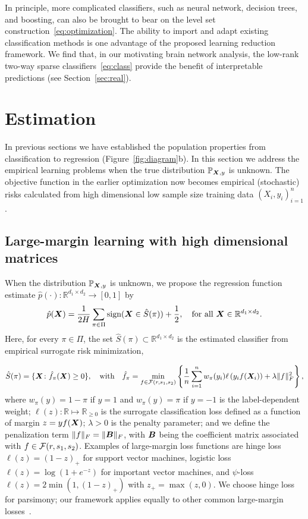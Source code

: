 \documentclass[11pt]{article}
\theoremstyle{plain}
\theoremstyle{definition}
\def\sign{\textup{sign}}
\begin{document}
In principle, more complicated classifiers, such as neural network, decision trees, and boosting, can also be brought to bear on the level set construction~\eqref{eq:optimization}. The ability to import and adapt existing classification methods is one advantage of the proposed learning reduction framework. We find that, in our motivating brain network analysis, the low-rank two-way sparse classifiers~\eqref{eq:class} provide the benefit of interpretable predictions (see Section~\ref{sec:real}). 

\section{Estimation}\label{sec:theory}
In previous sections we have established the population properties from classification to regression (Figure~\ref{fig:diagram}b). In this section we address the empirical learning problems when the true distribution $\mathbb{P}_{\bm X,y}$ is unknown. The objective function in the earlier optimization now becomes empirical (stochastic) risks calculated from high dimensional low sample size training data $(X_i,y_i)_{i=1}^n$. 

\subsection{Large-margin learning with high dimensional matrices}
When the distribution $\mathbb{P}_{\bm X,y}$ is unknown, we propose the regression function estimate $\hat p(\cdot)\colon \mathbb{R}^{d_1\times d_2} \to [0,1]$ by
\begin{equation}\label{eq:stepfunctionsample}
\hat p(\mX)= {1\over 2H}  \sum_{\pi \in \Pi} \sign (\mX\in \hat S(\pi))+{1\over 2},\quad \text{for all }\mX\in\mathbb{R}^{d_1\times d_2}.
\end{equation}
Here, for every $\pi\in\Pi$, the set $\hat S(\pi)\subset \mathbb{R}^{d_1\times d_2}$ is the estimated classifier from empirical surrogate risk minimization,

\begin{align}\label{eq:large-margin}
\hat S(\pi) = \{\bm X \colon \hat f_\pi(\bm X) \geq 0\}, \quad \text{with}\quad \hat f_\pi=\min_{f\in\mathcal{F}(r,s_1,s_2)}\left\{ {1\over n}\sum_{i=1}^n w_{\pi}(y_i)\ell\left(y_if(\bm X_i)\right)+ \lambda \lVert f\rVert_F^2\right\},
\end{align}
where $w_\pi(y) = 1-\pi $ if $y = 1$ and $w_\pi(y)=\pi$ if $y = -1$ is the label-dependent weight; $\ell(z)\colon \mathbb{R}\mapsto \mathbb{R}_{\geq 0}$ is the surrogate classification loss defined as a function of margin $z=yf(\bm X)$; $\lambda>0$ is the penalty parameter; and we define the penalization term $\lVert f\rVert_F=\lVert\bm B\rVert_F$, with $\bm B$ being the coefficient matrix associated with $f\in\mathcal{F}(r,s_1,s_2)$. Examples of large-margin loss functions are hinge loss $\ell(z) = (1-z)_+$ for support vector machines, logistic loss $\ell(z) =\log(1+e^{-z})$ for important vector machines, and $\psi$-loss $\ell(z)=2\min(1,(1-z)_+)$ with $z_{+}=\max(z,0)$. We choose hinge loss for parsimony; our framework applies equally to other common large-margin losses~\citep{bartlett2006convexity}. 
\end{document}
